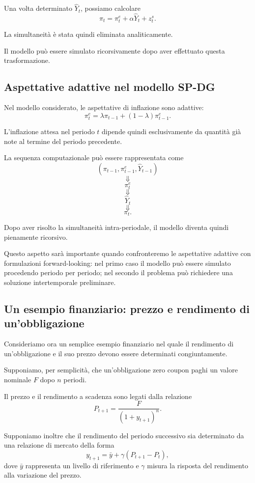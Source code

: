 \documentclass{book}
\begin{document}
Una volta determinato $\widehat{Y}_t$, possiamo calcolare
\[
\pi_t
=
\pi_t^e+\alpha\widehat{Y}_t+z_t^s.
\]

La simultaneità è stata quindi eliminata analiticamente.

Il modello può essere simulato ricorsivamente dopo aver effettuato questa
trasformazione.


\subsection{Aspettative adattive nel modello SP-DG}

Nel modello considerato, le aspettative di inflazione sono adattive:
\[
\pi_t^e
=
\lambda\pi_{t-1}
+
(1-\lambda)\pi_{t-1}^e.
\]

L'inflazione attesa nel periodo $t$ dipende quindi esclusivamente da
quantità già note al termine del periodo precedente.

La sequenza computazionale può essere rappresentata come
\[
(\pi_{t-1},\pi_{t-1}^e,\widehat{Y}_{t-1})
\]
\[
\Downarrow
\]
\[
\pi_t^e
\]
\[
\Downarrow
\]
\[
\widehat{Y}_t
\]
\[
\Downarrow
\]
\[
\pi_t.
\]

Dopo aver risolto la simultaneità intra-periodale, il modello diventa
quindi pienamente ricorsivo.

Questo aspetto sarà importante quando confronteremo le aspettative
adattive con formulazioni forward-looking: nel primo caso il modello può
essere simulato procedendo periodo per periodo; nel secondo il problema
può richiedere una soluzione intertemporale preliminare.


\subsection{Un esempio finanziario: prezzo e rendimento di un'obbligazione}

Consideriamo ora un semplice esempio finanziario nel quale il rendimento
di un'obbligazione e il suo prezzo devono essere determinati congiuntamente.

Supponiamo, per semplicità, che un'obbligazione zero coupon paghi un valore
nominale $F$ dopo $n$ periodi.

Il prezzo e il rendimento a scadenza sono legati dalla relazione
\[
P_{t+1}
=
\frac{F}
{(1+y_{t+1})^n}.
\]

Supponiamo inoltre che il rendimento del periodo successivo sia determinato
da una relazione di mercato della forma
\[
y_{t+1}
=
\bar{y}
+
\gamma(P_{t+1}-P_t),
\]
dove $\bar{y}$ rappresenta un livello di riferimento e $\gamma$ misura la
risposta del rendimento alla variazione del prezzo.
\end{document}
